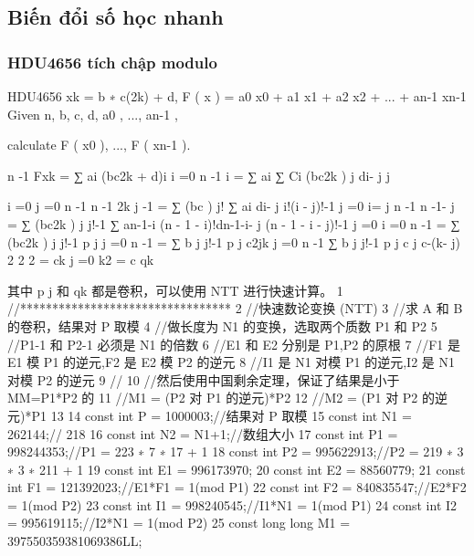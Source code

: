 \documentclass[11pt]{article}
\begin{document}
\subsection{Biến đổi số học nhanh}

\subsubsection{HDU4656 tích chập modulo}

\begin{Code}
     HDU4656
     xk = b ∗ c(2k) + d, F ( x ) = a0 x0 + a1 x1 + a2 x2 + ... + an-1 xn-1 Given n, b, c, d, a0 , ..., an-1 ,


     calculate F ( x0 ), ..., F ( xn-1 ).

                                   n -1
                        Fxk = ∑ ai (bc2k + d)i
                                   i =0
                            n -1          i
                        = ∑ ai ∑ Ci (bc2k ) j di- j
                                              j

                            i =0      j =0
                            n -1                    n -1
                                          2k j -1
                        = ∑ (bc ) j!                ∑ ai di- j i!(i - j)!-1
                            j =0                    i= j
                            n -1                    n -1- j
                        = ∑ (bc2k ) j j!-1           ∑ an-1-i (n - 1 - i)!dn-1-i- j (n - 1 - i - j)!-1
                            j =0                     i =0
                            n -1
                        = ∑ (bc2k ) j j!-1 p j
                            j =0
                            n -1
                        = ∑ b j j!-1 p j c2jk
                            j =0
                                   n -1
                                   ∑ b j j!-1 p j c j c-(k- j)
                               2                      2          2
                        = ck
                                   j =0
                             k2
                        = c qk

     其中 p j 和 qk 都是卷积，可以使用 NTT 进行快速计算。
 1   //*********************************
 2   //快速数论变换 (NTT)
 3   //求 A 和 B 的卷积，结果对 P 取模
 4   //做长度为 N1 的变换，选取两个质数 P1 和 P2
 5   //P1-1 和 P2-1 必须是 N1 的倍数
 6   //E1 和 E2 分别是 P1,P2 的原根
 7   //F1 是 E1 模 P1 的逆元,F2 是 E2 模 P2 的逆元
 8   //I1 是 N1 对模 P1 的逆元,I2 是 N1 对模 P2 的逆元
 9   //
10   //然后使用中国剩余定理，保证了结果是小于 MM=P1*P2 的
11   //M1 = (P2 对 P1 的逆元)*P2
12   //M2 = (P1 对 P2 的逆元)*P1
13
14   const int P = 1000003;//结果对 P 取模
15   const int N1 = 262144;// 218
16   const int N2 = N1+1;//数组大小
17   const int P1 = 998244353;//P1 = 223 ∗ 7 ∗ 17 + 1
18   const int P2 = 995622913;//P2 = 219 ∗ 3 ∗ 3 ∗ 211 + 1
19   const int E1 = 996173970;
20   const int E2 = 88560779;
21   const int F1 = 121392023;//E1*F1 = 1(mod P1)
22   const int F2 = 840835547;//E2*F2 = 1(mod P2)
23   const int I1 = 998240545;//I1*N1 = 1(mod P1)
24   const int I2 = 995619115;//I2*N1 = 1(mod P2)
25   const long long M1 = 397550359381069386LL;



\end{Code}
\end{document}

